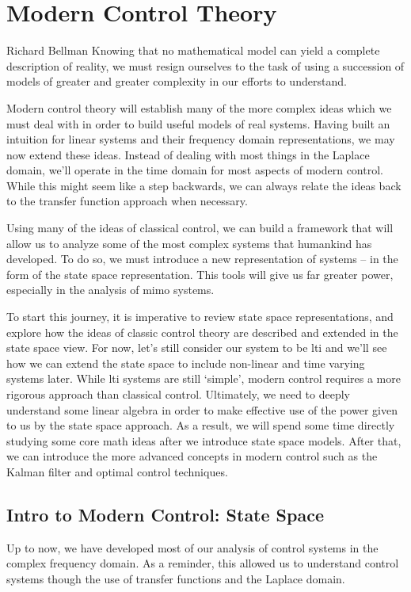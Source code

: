 
\part{Modern Control Theory}\label{part:modern control}

\begin{chapquote}{Richard Bellman}
Knowing that no mathematical model can yield a complete description of reality, we must resign ourselves to the task of using a succession of models of greater and greater complexity in our efforts to understand.
\end{chapquote}

\newpage
Modern control theory will establish many of the more complex ideas which we must deal with in order to build useful models of real systems. Having built an intuition for linear systems and their frequency domain representations, we may now extend these ideas. Instead of dealing with most things in the Laplace domain, we'll operate in the time domain for most aspects of modern control. While this might seem like a step backwards, we can always relate the ideas back to the transfer function approach when necessary.

Using many of the ideas of classical control, we can build a framework that will allow us to analyze some of the most complex systems that humankind has developed. To do so, we must introduce a new representation of systems -- in the form of the state space representation. This tools will give us far greater power, especially in the analysis of \gls{mimo} systems. 

To start this journey, it is imperative to review state space representations, and explore how the ideas of classic control theory are described and extended in the state space view. For now, let's still consider our system to be \gls{lti} and we'll see how we can extend the state space to include non-linear and time varying systems later. While \gls{lti} systems are still `simple', modern control requires a more rigorous approach than classical control. Ultimately, we need to deeply understand some linear algebra in order to make effective use of the power given to us by the state space approach. As a result, we will spend some time directly studying some core math ideas after we introduce state space models. After that, we can introduce the more advanced concepts in modern control such as the Kalman filter and optimal control techniques.

\chapter{Intro to Modern Control: State Space}\label{chap: state space}
Up to now, we have developed most of our analysis of control systems in the complex frequency domain. As a reminder, this allowed us to understand control systems though the use of transfer functions and the Laplace domain.

